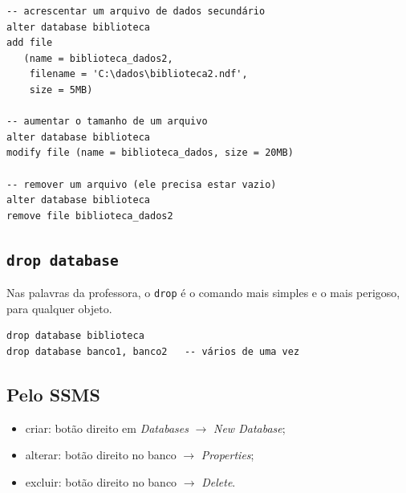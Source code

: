 \begin{lstlisting}[caption={Alterações comuns nos arquivos de um banco.}]
-- acrescentar um arquivo de dados secundário
alter database biblioteca
add file
   (name = biblioteca_dados2,
    filename = 'C:\dados\biblioteca2.ndf',
    size = 5MB)

-- aumentar o tamanho de um arquivo
alter database biblioteca
modify file (name = biblioteca_dados, size = 20MB)

-- remover um arquivo (ele precisa estar vazio)
alter database biblioteca
remove file biblioteca_dados2
\end{lstlisting}

\subsection{\texttt{drop database}}

Nas palavras da professora, o \texttt{drop} é o comando mais simples e o
mais perigoso, para qualquer objeto.

\begin{lstlisting}
drop database biblioteca
drop database banco1, banco2   -- vários de uma vez
\end{lstlisting}

\subsection{Pelo SSMS}

\begin{itemize}
	\item criar: botão direito em \emph{Databases} $\rightarrow$ \emph{New
	Database};
	\item alterar: botão direito no banco $\rightarrow$ \emph{Properties};
	\item excluir: botão direito no banco $\rightarrow$ \emph{Delete}.
\end{itemize}
